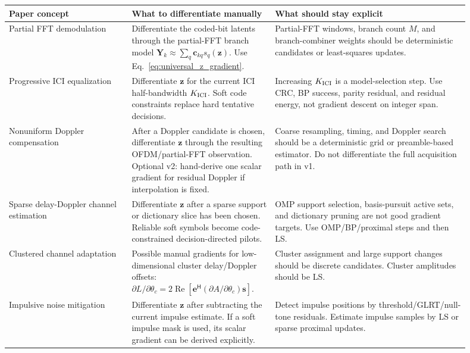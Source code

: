 \documentclass[11pt]{article}
\newcommand{\Hh}{^{\mathsf H}}
\newcommand{\Ree}{\operatorname{Re}}
\begin{document}
\begin{longtable}{@{}>{\raggedright\arraybackslash}p{0.24\linewidth}>{\raggedright\arraybackslash}p{0.28\linewidth}>{\raggedright\arraybackslash}p{0.38\linewidth}@{}}
\toprule
Paper concept & What to differentiate manually & What should stay explicit \\
\midrule
Partial FFT demodulation
& Differentiate the coded-bit latents through the partial-FFT branch model
$\bm Y_k\approx\sum_q \bm c_{kq}s_q(\bm z)$.  Use
Eq.~\eqref{eq:universal_z_gradient}.
& Partial-FFT windows, branch count $M$, and branch-combiner weights should be
deterministic candidates or least-squares updates. \\

Progressive ICI equalization
& Differentiate $\bm z$ for the current ICI half-bandwidth
$K_{\rm ICI}$.  Soft code constraints replace hard tentative decisions.
& Increasing $K_{\rm ICI}$ is a model-selection step.  Use CRC, BP success,
parity residual, and residual energy, not gradient descent on integer span. \\

Nonuniform Doppler compensation
& After a Doppler candidate is chosen, differentiate $\bm z$ through the
resulting OFDM/partial-FFT observation.  Optional v2: hand-derive one scalar
gradient for residual Doppler if interpolation is fixed.
& Coarse resampling, timing, and Doppler search should be a deterministic grid
or preamble-based estimator.  Do not differentiate the full acquisition path in
v1. \\

Sparse delay-Doppler channel estimation
& Differentiate $\bm z$ after a sparse support or dictionary slice has been
chosen.  Reliable soft symbols become code-constrained decision-directed pilots.
& OMP support selection, basis-pursuit active sets, and dictionary pruning are
not good gradient targets.  Use OMP/BP/proximal steps and then LS. \\

Clustered channel adaptation
& Possible manual gradients for low-dimensional cluster delay/Doppler offsets:
$\partial L/\partial\theta_c=2\Ree[\bm e\Hh(\partial A/\partial\theta_c)\bm s]$.
& Cluster assignment and large support changes should be discrete candidates.
Cluster amplitudes should be LS. \\

Impulsive noise mitigation
& Differentiate $\bm z$ after subtracting the current impulse estimate.  If a
soft impulse mask is used, its scalar gradient can be derived explicitly.
& Detect impulse positions by threshold/GLRT/null-tone residuals.  Estimate
impulse samples by LS or sparse proximal updates. \\


\end{longtable}
\end{document}
